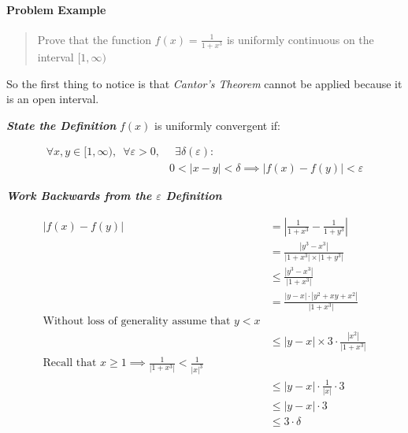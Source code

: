 \documentclass[class=article, crop=false]{standalone}
\begin{document}
\hypertarget{problem-example}{%
\paragraph{Problem Example}\label{problem-example}}

\begin{quote}
Prove that the function \(f\left( x \right) = \frac{1}{1+ x^3}\) is
uniformly continuous on the interval \([1, \infty)\)
\end{quote}

So the first thing to notice is that \emph{Cantor's Theorem} cannot be
applied because it is an open interval.

\textbf{\emph{State the Definition}} \(f\left( x \right)\) is uniformly
convergent if:

\begin{align*}
  \forall x,y \in [1, \infty), \enspace \forall \varepsilon>0,& \enspace \exists \delta\left( \varepsilon \right) :\\
  &0<    \left| x- y \right| <\delta  \implies      \left| f\left( x \right) - f\left( y \right)  \right| < \varepsilon
\end{align*}

 \textbf{\emph{Work Backwards from the \(\varepsilon\) Definition}}

\begin{align*}
  \left| f\left( x \right) - f\left( y \right)  \right| &=     \left| \frac{1}{1+ x^3} - \frac{1}{1+ y^3}\right| \\
  &= \frac{    \left| y^3- x^3 \right| }{    \left| 1+ x^3 \right| \times     \left| 1+ y^3 \right| }\\
  &\leq \frac{    \left| y^3- x^3 \right| }{    \left| 1+ x^3 \right| }\\
  &= \frac{    \left| y- x \right| \cdot     \left| y^2+ xy+ x^2 \right| }{    \left| 1+ x^3 \right| }\\
  \text{Without loss of generality assume that $y<x$}\\
  &\leq     \left| y- x \right| \times 3\cdot \frac{    \left| x^2 \right| }{    \left| 1+ x^3 \right| }\\
  \text{Recall that $x\geq 1  \implies  \frac{1}{    \left| 1+ x^3 \right| }< \frac{1}{    \left| x \right| ^3}$}\\
  &\leq     \left| y- x \right| \cdot \frac{1}{    \left| x \right| } \cdot 3\\
  &\leq     \left| y- x \right| \cdot 3\\
  &\leq     3\cdot \delta\\
\end{align*}
\end{document}
